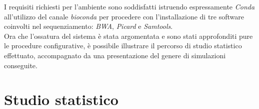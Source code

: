 I requisiti richiesti per l'ambiente sono soddisfatti istruendo espressamente \textit{Conda} all'utilizzo del canale \textit{bioconda} per procedere con l'installazione di tre software coinvolti nel sequenziamento: \textit{BWA}, \textit{Picard} e \textit{Samtools}.\\ 
Ora che l'ossatura del sistema è stata argomentata e sono stati approfonditi pure le procedure configurative, è possibile illustrare il percorso di studio statistico effettuato, accompagnato da una presentazione del genere di simulazioni conseguite.

\section{Studio statistico}
         